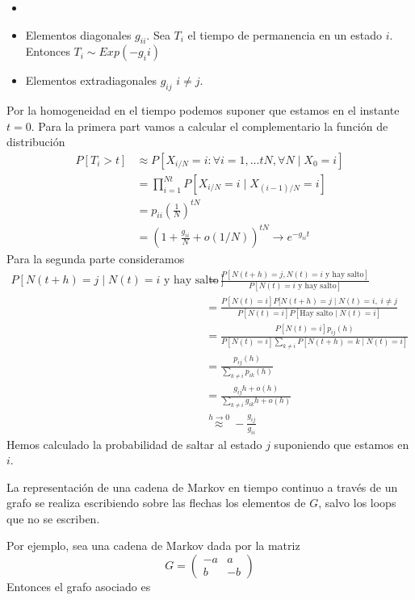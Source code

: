 \documentclass[PREyA.tex]{subfiles}
\begin{document}
\begin{prop}[Interpretación de $G$] 
\begin{itemize}
\item[]
\item Elementos diagonales $g_{ii}$. Sea $T_i$ el tiempo de permanencia en un estado $i$. Entonces $T_i \sim Exp(-g_ii)$
\item Elementos extradiagonales $g_{ij}$ $i\neq j$. 
\end{itemize}
\end{prop}
\begin{dem}
Por la homogeneidad en el tiempo podemos suponer que estamos en el instante $t=0$. Para la primera part vamos a calcular el complementario la función de distribución
\begin{align*}
P[T_i > t] &\approx P[X_{i/N} =i \colon \forall i = 1,\dotsc tN, \forall N \mid X_0 = i]\\
&= \prod_{i=1}^{Nt} P[X_{i/N}=i\mid X_{(i-1)/N}=i]\\
&= p_{ii}\left(\frac{1}{N}\right)^{tN} \\
&= \left(1+\frac{g_{ii}}{N}+o(1/N)\right)^{tN} \longrightarrow e^{-g_{ii} t}
\end{align*}
Para la segunda parte consideramos
\begin{align*}
P[N(t+h) = j \mid N(t)=i \text{ y hay salto}] &= \frac{P[N(t+h) = j, N(t)=i \text{ y hay salto}]}{P[N(t)=i \text{ y hay salto}]}\\
&=\frac{P[N(t)=i]P[N(t+h)=j\mid N(t)=i,\;i\neq j}{P[N(t)=i]P[\text{Hay salto}\mid N(t)=i]}\\
&=\frac{P[N(t)=i]p_{ij}(h)}{P[N(t)=i]\sum_{k\neq i} P[N(t+h)=k\mid N(t)=i]}\\
&=\frac{p_{ij}(h)}{\sum_{k\neq i} p_{ik}(h)}\\
&= \frac{g_{ij}h+o(h)}{\sum_{k\neq i} g_{ik}h+o(h)}\\
&\overset{h\to 0}{\approx} -\frac{g_{ij}}{g_{ii}}
\end{align*}
Hemos calculado la probabilidad de saltar al estado $j$ suponiendo que estamos en $i$.
\end{dem} 
\begin{nota}
La representación de una cadena de Markov en tiempo continuo a través de un grafo se realiza escribiendo sobre las flechas los elementos de $G$, salvo los loops que no se escriben. 

Por ejemplo, sea una cadena de Markov dada por la matriz
$$
G= 
\begin{pmatrix}
-a & a\\
b & -b
\end{pmatrix}
$$
Entonces el grafo asociado es
\begin{center}
\end{center}
\end{nota}
\end{document}
